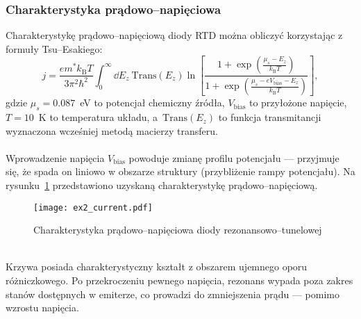 \documentclass{article}
\begin{document}
\subsubsection{Charakterystyka prądowo--napięciowa}
Charakterystykę prądowo--napięciową diody RTD można obliczyć korzystając z formuły Tsu--Esakiego:
\begin{equation}
    j = \frac{em^*k_{\text{B}}T}{3\pi^2\hbar^2}
    \int_{0}^{\infty}\dd E_z \ \text{Trans}(E_z)\ln\left[\frac{1 + \exp\left(\frac{\mu_s - E_z}{k_{\text{B}}T} \right)}{1 + \exp\left(\frac{\mu_s - eV_{\text{bias}} - E_z}{k_{\text{B}}T} \right)}\right],
\end{equation}
gdzie $\mu_s = 0.087$~eV to potencjał chemiczny źródła, $V_{\text{bias}}$ to przyłożone napięcie, $T = 10$~K to temperatura układu, a~$\text{Trans}(E_z)$ to funkcja transmitancji wyznaczona wcześniej metodą macierzy transferu.\\
\\
Wprowadzenie napięcia $V_{\text{bias}}$ powoduje zmianę profilu potencjału — przyjmuje się, że spada on liniowo w obszarze struktury (przybliżenie rampy potencjału).
Na rysunku~\ref{fig:ex2-current} przedstawiono uzyskaną charakterystykę prądowo--napięciową.\\
\begin{figure}[htp!]
    \centering
    \texttt{[image: ex2\_current.pdf]}
    \caption{Charakterystyka prądowo--napięciowa diody rezonansowo--tunelowej}
    \label{fig:ex2-current}
\end{figure}
\\
Krzywa posiada charakterystyczny kształt z obszarem ujemnego oporu różniczkowego. 
Po przekroczeniu pewnego napięcia, rezonans wypada poza zakres stanów dostępnych w emiterze, co prowadzi do zmniejszenia prądu — pomimo wzrostu napięcia. 
\end{document}
